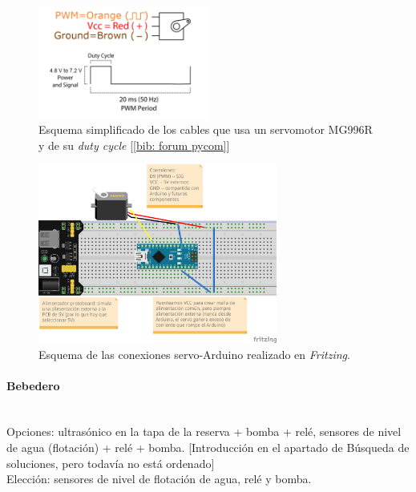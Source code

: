 \documentclass[12pt]{article}
\newcommand{\subsubsubsection}[1]{\paragraph{#1}\mbox{}\\}
\begin{document}
	\begin{figure}[h!]
		\begin{center}
			\includegraphics[width=0.5\textwidth]{img/servo_dutyCycle.png}
			\caption{Esquema simplificado de los cables que usa un servomotor MG996R y de su \textit{duty cycle} [\ref{bib: forum pycom}]}
			\label{Esquema conexiones servo}
		\end{center}
	\end{figure}
	
	\begin{figure}[h!]
		\begin{center}
			\includegraphics[width=0.7\textwidth]{img/servo_connections_v2_fritzing.png}
			\caption{Esquema de las conexiones servo-Arduino realizado en \textit{Fritzing}.}
			\label{Esquema conexiones servo Fritzing}
		\end{center}
	\end{figure}
	
	\pagebreak
	
	\subsubsubsection{Bebedero}
	
	\noindent Opciones: ultrasónico en la tapa de la reserva + bomba + relé, sensores de nivel de agua (flotación) + relé + bomba. [Introducción en el apartado de Búsqueda de soluciones, pero todavía no está ordenado]\\
	
	\noindent Elección: sensores de nivel de flotación de agua, relé y bomba. \\
	
\end{document}
